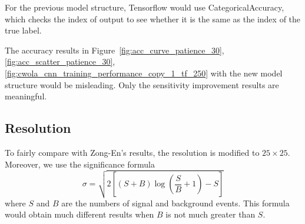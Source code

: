 \documentclass[12pt]{article}
\begin{document}
		For the previous model structure, Tensorflow would use CategoricalAccuracy, which checks the index of output to see whether it is the same as the index of the true label.

		The accuracy results in Figure~\ref{fig:acc_curve_patience_30}, \ref{fig:acc_scatter_patience_30}, \ref{fig:cwola_cnn_training_performance_copy_1_tf_250} with the new model structure would be misleading. Only the sensitivity improvement results are meaningful.
	\subsection{Resolution}%
	\label{sub:resolution}
		To fairly compare with Zong-En's results, the resolution is modified to $25 \times 25$. Moreover, we use the significance formula
		\begin{equation}
			\sigma = \sqrt{2\left[ \left( S+B \right) \log\left( \frac{S}{B} + 1 \right) - S  \right] }
		\end{equation}
		where $S$ and $B$ are the numbers of signal and background events. This formula would obtain much different results when $B$ is not much greater than $S$.
\end{document}
